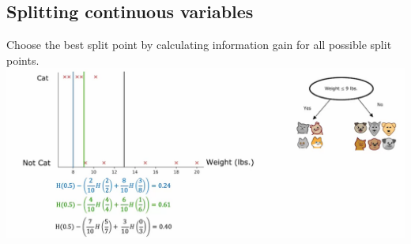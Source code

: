 \subsection*{Splitting continuous variables}
Choose the best split point by calculating information gain for all possible split points.\\
\includegraphics*[width=\textwidth]{images/11.9}

